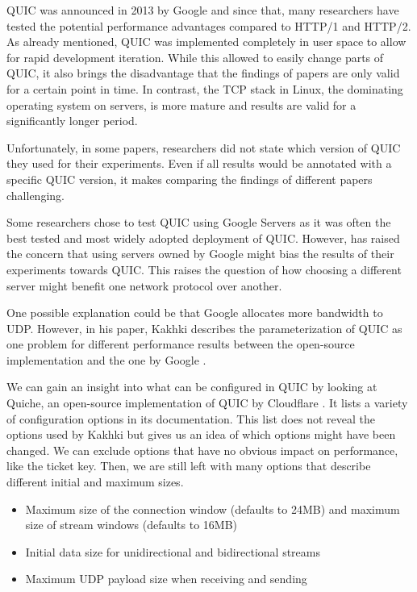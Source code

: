\documentclass[conference]{IEEEtran}
\begin{document}
QUIC was announced in 2013 by Google and since that, many researchers have tested the potential performance advantages compared to HTTP/1 and HTTP/2. As already mentioned, QUIC was implemented completely in user space to allow for rapid development iteration. While this allowed to easily change parts of QUIC, it also brings the disadvantage that the findings of papers are only valid for a certain point in time. In contrast, the TCP stack in Linux, the dominating operating system on servers, is more mature and results are valid for a significantly longer period. 

Unfortunately, in some papers, researchers did not state which version of QUIC they used for their experiments. Even if all results would be annotated with a specific QUIC version, it makes comparing the findings of different papers challenging.

Some researchers chose to test QUIC using Google Servers as it was often the best tested and most widely adopted deployment of QUIC. However, \cite{Nepomuceno} has raised the concern that using servers owned by Google might bias the results of their experiments towards QUIC. This raises the question of how choosing a different server might benefit one network protocol over another.

One possible explanation could be that Google allocates more bandwidth to UDP. However, in his paper, Kakhki describes the parameterization of QUIC as one problem for different performance results between the open-source implementation and the one by Google \cite{Kakhki}. 

We can gain an insight into what can be configured in QUIC by looking at Quiche, an open-source implementation of QUIC by Cloudflare \cite{Quiche}. It lists a variety of configuration options in its documentation. This list does not reveal the options used by Kakhki but gives us an idea of which options might have been changed. We can exclude options that have no obvious impact on performance, like the ticket key. Then, we are still left with many options that describe different initial and maximum sizes.

\begin{itemize}
  \item Maximum size of the connection window (defaults to 24MB) and maximum size of stream windows (defaults to 16MB)
  \item Initial data size for unidirectional and bidirectional streams
  \item Maximum UDP payload size when receiving and sending
\end{itemize}
\end{document}

